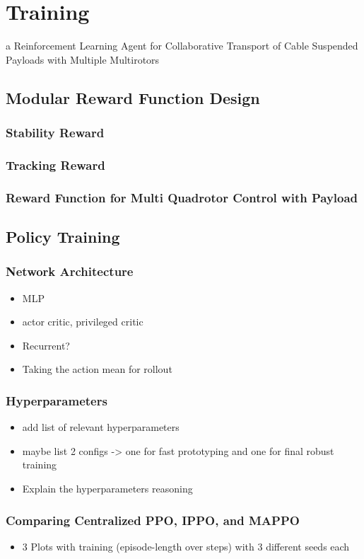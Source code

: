 \chapter{Training}
a Reinforcement Learning Agent for Collaborative Transport of Cable Suspended Payloads with Multiple Multirotors
\section{Modular Reward Function Design}
\subsection{Stability Reward}
\subsection{Tracking Reward}
\subsection{Reward Function for Multi Quadrotor Control with Payload}

\section{Policy Training}
\subsection{Network Architecture}
\begin{itemize}
    \item MLP
    \item actor critic, privileged critic
    \item Recurrent?
    \item Taking the action mean for rollout
\end{itemize}
\subsection{Hyperparameters}
\begin{itemize}
    \item add list of relevant hyperparameters
    \item maybe list 2 configs -> one for fast prototyping and one for final robust training
    \item Explain the hyperparameters reasoning
\end{itemize}
\subsection{Comparing Centralized PPO, IPPO, and MAPPO}

\begin{itemize}
    \item 3 Plots with training (episode-length over steps) with 3 different seeds each
\end{itemize}




